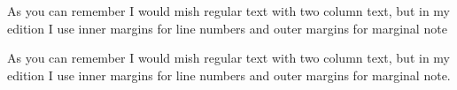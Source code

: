 \documentclass{article}
\begin{document}
\begin{pairs}
  \begin{Leftside}
    \beginnumbering
    \pstart
    As you can remember I would mish regular text with two column text, but in my edition I use inner margins for line numbers and outer margins for marginal note
    \pend
    \endnumbering
  \end{Leftside}
  \begin{Rightside}
    \beginnumbering
    \pstart
    As you can remember I would mish regular text with two column text, but in my edition I use inner margins for line numbers and outer margins for marginal note.
    \pend
    \endnumbering
  \end{Rightside}
\end{pairs}
\Columns
\end{document}
